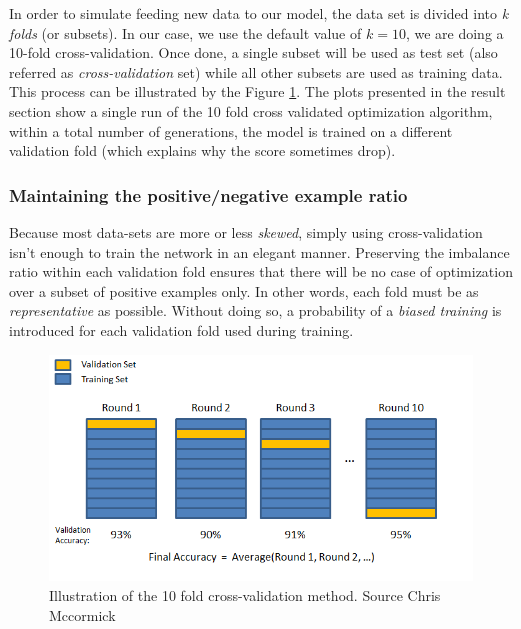 \documentclass[a4paper,12pt, oneside]{memoir}
\begin{document}
In order to simulate feeding new data to our model, the data set is divided into \textit{k} \textit{folds} (or subsets). In our case, we use the default value of $k = 10$, we are doing a 10-fold cross-validation. Once done, a single subset will be used as test set (also referred as \textit{cross-validation} set) while all other subsets are used as training data. This process can be illustrated by the Figure \ref{figure-cross-validation}. The plots presented in the result section show a single run of the 10 fold cross validated optimization algorithm, within a total number of generations, the model is trained on a different validation fold (which explains why the score sometimes drop).

\subsubsection{Maintaining the positive/negative example ratio}

Because most data-sets are more or less \textit{skewed}, simply using cross-validation isn't enough to train the network in an elegant manner. Preserving the imbalance ratio within each validation fold ensures that there will be no case of optimization over a subset of positive examples only. In other words, each fold must be as \textit{representative} as possible. Without doing so, a probability of a \textit{biased training} is introduced for each validation fold used during training.

\begin{figure}[!h]
  \begin{center}
    \includegraphics[scale=0.75]{cross_validation_mccormick}
  \end{center}
  \caption{Illustration of the 10 fold cross-validation method. Source Chris Mccormick\cite{mccormick-2013}}
  \label{figure-cross-validation}
\end{figure}
\end{document}
